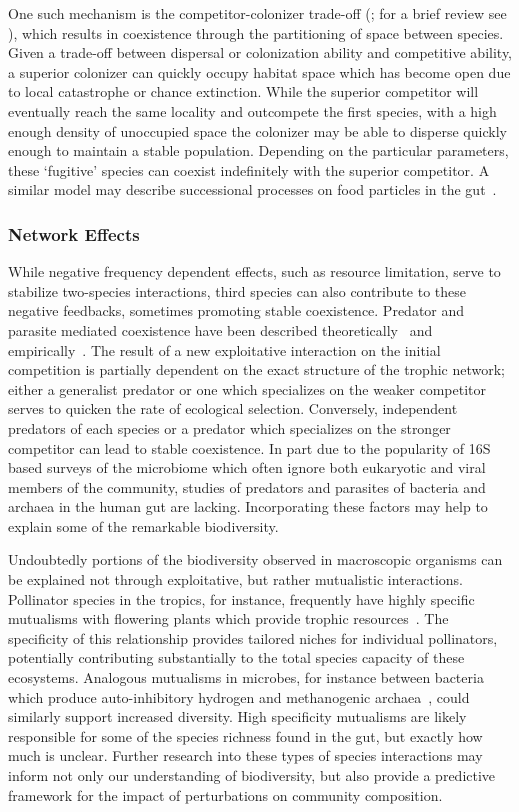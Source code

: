 \documentclass[12pt]{article}
\begin{document}
One such mechanism is the competitor-colonizer trade-off
(\citealp{Levins1971}; for a brief review see \citealp{Yu2001}),
which results in coexistence through the partitioning of space between species.
Given a trade-off between dispersal or colonization ability
and competitive ability,
a superior colonizer can quickly occupy habitat space which has become open
due to local catastrophe or chance extinction.
While the superior competitor will eventually reach the same locality
and outcompete the first species,
with a high enough density of unoccupied space
the colonizer may be able to disperse quickly enough to maintain a stable
population.
Depending on the particular parameters,
these `fugitive' species can coexist indefinitely with the superior competitor.
A similar model may describe successional processes
on food particles in the gut~\citep{TODO}.

\subsubsection{Network Effects}
While negative frequency dependent effects,
such as resource limitation,
serve to stabilize two-species interactions,
third species can also contribute to these negative feedbacks,
sometimes promoting stable coexistence.
Predator and parasite mediated coexistence have been described
theoretically~\citep{Caswell1978} and
empirically~\citep{Paine1966,TODO}.
The result of a new exploitative interaction on the initial
competition is partially dependent on the exact structure of the
trophic network;
either a generalist predator or one which specializes on the weaker
competitor serves to quicken the rate of ecological selection.
Conversely, independent predators of each species or a predator
which specializes on the stronger competitor can lead to stable
coexistence.
In part due to the popularity of 16S based surveys of the
microbiome
which often ignore both eukaryotic
and viral members of the community,
studies of predators and parasites of bacteria and archaea
in the human gut are lacking.
Incorporating these factors may help to explain some of the
remarkable biodiversity.

Undoubtedly portions of the biodiversity observed in macroscopic
organisms can be explained not through exploitative,
but rather mutualistic interactions.
Pollinator species in the tropics, for instance, frequently
have highly specific mutualisms with flowering plants which
provide trophic resources~\citep{TODO}.
The specificity of this relationship provides tailored niches
for individual pollinators, potentially contributing substantially
to the total species capacity of these ecosystems.
Analogous mutualisms in microbes, for instance
between bacteria which produce auto-inhibitory hydrogen
and methanogenic archaea~\citep{TODO}, could similarly support increased
diversity.
High specificity mutualisms are likely responsible for some of the species
richness found in the gut,
but exactly how much is unclear.
Further research into these types of species interactions
may inform not only our understanding of biodiversity,
but also provide a predictive framework for the impact of
perturbations on community composition.
\end{document}
